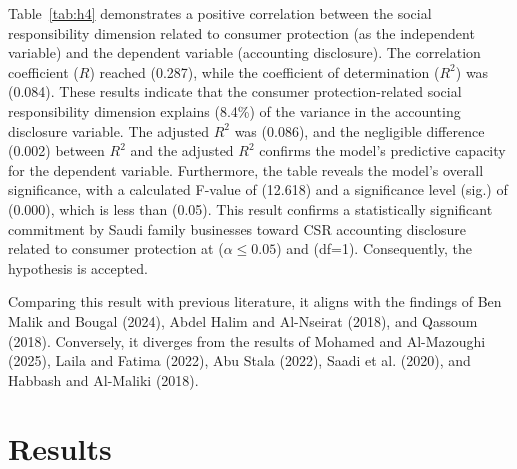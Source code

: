 \documentclass[10pt]{NSP1}
\begin{document}
	Table~\ref{tab:h4} demonstrates a positive correlation between the social responsibility dimension related to consumer protection (as the independent variable) and the dependent variable (accounting disclosure). The correlation coefficient (\(R\)) reached (0.287), while the coefficient of determination (\(R^2\)) was (0.084). These results indicate that the consumer protection-related social responsibility dimension explains (8.4\%) of the variance in the accounting disclosure variable. The adjusted \(R^2\) was (0.086), and the negligible difference (0.002) between \(R^2\) and the adjusted \(R^2\) confirms the model's predictive capacity for the dependent variable. Furthermore, the table reveals the model's overall significance, with a calculated F-value of (12.618) and a significance level (sig.) of (0.000), which is less than (0.05). This result confirms a statistically significant commitment by Saudi family businesses toward CSR accounting disclosure related to consumer protection at (\(\alpha \leq 0.05\)) and (df=1). Consequently, the hypothesis is accepted.
	
	Comparing this result with previous literature, it aligns with the findings of Ben Malik and Bougal (2024), Abdel Halim and Al-Nseirat (2018), and Qassoum (2018). Conversely, it diverges from the results of Mohamed and Al-Mazoughi (2025), Laila and Fatima (2022), Abu Stala (2022), Saadi et al. (2020), and Habbash and Al-Maliki (2018).
	
	\section{Results}
	
\end{document}
